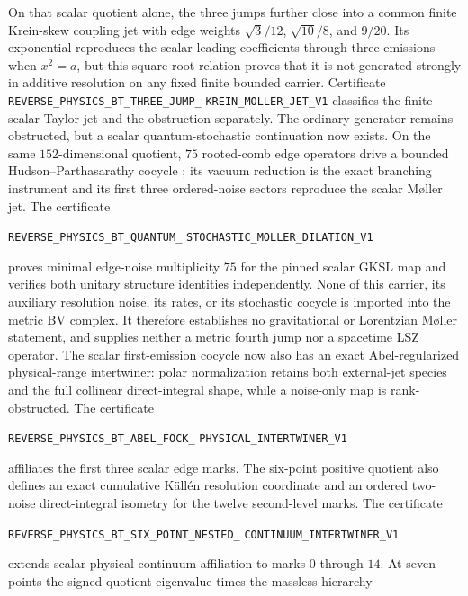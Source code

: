 \documentclass[11pt]{article}
\theoremstyle{definition}
\theoremstyle{remark}
\begin{document}
On that scalar quotient alone, the three jumps further close into a common
finite Krein-skew coupling jet with edge weights
$\sqrt3/12$, $\sqrt{10}/8$, and $9/20$.  Its exponential reproduces the
scalar leading coefficients through three emissions when $x^2=a$, but this
square-root relation proves that it is not generated strongly in additive
resolution on any fixed finite bounded carrier.  Certificate
\texttt{REVERSE\_PHYSICS\_BT\_THREE\_JUMP\_}
\allowbreak\texttt{KREIN\_MOLLER\_JET\_V1}
classifies the finite scalar Taylor jet and the obstruction separately.  The
ordinary generator remains obstructed, but a scalar quantum-stochastic
continuation now exists.  On the same $152$-dimensional quotient, $75$
rooted-comb edge operators drive a bounded Hudson--Parthasarathy cocycle
\cite{HudsonParthasarathy1984}; its vacuum reduction is the exact branching
instrument and its first three ordered-noise sectors reproduce the scalar
M\o ller jet.  The certificate
\par\noindent
\texttt{REVERSE\_PHYSICS\_BT\_QUANTUM\_}
\allowbreak\texttt{STOCHASTIC\_MOLLER\_DILATION\_V1}
\par\noindent
proves minimal edge-noise multiplicity $75$ for the pinned scalar GKSL map
and verifies both unitary structure identities independently.  None of this
carrier, its auxiliary resolution noise, its rates, or its stochastic
cocycle is imported into the metric BV complex.  It therefore establishes
no gravitational or Lorentzian M\o ller statement, and supplies neither a
metric fourth jump nor a spacetime LSZ operator.
The scalar first-emission cocycle now also has an exact Abel-regularized
physical-range intertwiner: polar normalization retains both external-jet
species and the full collinear direct-integral shape, while a noise-only map is
rank-obstructed.  The certificate
\par\noindent
\texttt{REVERSE\_PHYSICS\_BT\_ABEL\_FOCK\_}
\allowbreak\texttt{PHYSICAL\_INTERTWINER\_V1}
\par\noindent
affiliates the first three scalar edge marks.  The six-point positive quotient
also defines an exact cumulative K\"all\'en resolution coordinate and an
ordered two-noise direct-integral isometry for the twelve second-level marks.
The certificate
\par\noindent
\texttt{REVERSE\_PHYSICS\_BT\_SIX\_POINT\_NESTED\_}
\allowbreak\texttt{CONTINUUM\_INTERTWINER\_V1}
\par\noindent
extends scalar physical continuum affiliation to marks $0$ through $14$.
At seven points the signed quotient eigenvalue times the massless-hierarchy
\end{document}
